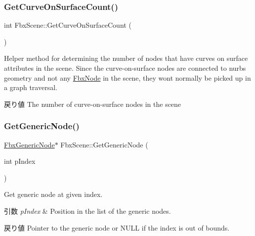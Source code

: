 \subsubsection{\texorpdfstring{Get\+Curve\+On\+Surface\+Count()}{GetCurveOnSurfaceCount()}}
{\footnotesize\ttfamily int Fbx\+Scene\+::\+Get\+Curve\+On\+Surface\+Count (\begin{DoxyParamCaption}{ }\end{DoxyParamCaption})}

Helper method for determining the number of nodes that have curves on surface attributes in the scene. Since the curve-\/on-\/surface nodes are connected to nurbs geometry and not any \hyperlink{class_fbx_node}{Fbx\+Node} in the scene, they won\textquotesingle{}t normally be picked up in a graph traversal. \begin{DoxyReturn}{戻り値}
The number of curve-\/on-\/surface nodes in the scene 
\end{DoxyReturn}
\mbox{\label{class_fbx_scene_abb58edd9139efcf577a2c910202fd842}} 
\subsubsection{\texorpdfstring{Get\+Generic\+Node()}{GetGenericNode()}\hspace{0.1cm}{\footnotesize\ttfamily [1/2]}}
{\footnotesize\ttfamily \hyperlink{class_fbx_generic_node}{Fbx\+Generic\+Node}$\ast$ Fbx\+Scene\+::\+Get\+Generic\+Node (\begin{DoxyParamCaption}\item[{int}]{p\+Index }\end{DoxyParamCaption})}

Get generic node at given index. 
\begin{DoxyParams}{引数}
{\em p\+Index} & Position in the list of the generic nodes. \\
\hline
\end{DoxyParams}
\begin{DoxyReturn}{戻り値}
Pointer to the generic node or {\ttfamily N\+U\+LL} if the index is out of bounds. 
\end{DoxyReturn}
\mbox{\label{class_fbx_scene_ad5a5ab95c93631d8c39acc39da689313}} 
